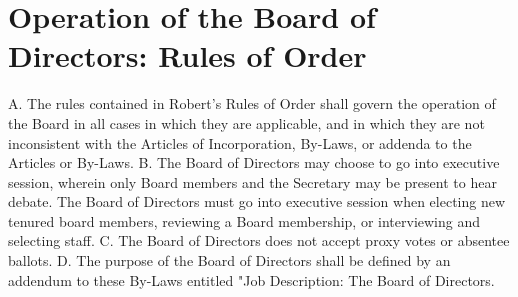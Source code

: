 \documentclass{article}
\begin{document}
\section{Operation of the Board of Directors: Rules of Order}
A.	The rules contained in Robert's Rules of Order shall govern the operation of the Board in all cases in which they are applicable, and in which they are not inconsistent with the Articles of Incorporation, By-Laws, or addenda to the Articles or By-Laws.
B.	The Board of Directors may choose to go into executive session, wherein only Board members and the Secretary may be present to hear debate.  The Board of Directors must go into executive session when electing new tenured board members, reviewing a Board membership, or interviewing and selecting staff.
C.	The Board of Directors does not accept proxy votes or absentee ballots.
D.	The purpose of the Board of Directors shall be defined by an addendum to these By-Laws entitled "Job Description: The Board of Directors.
\end{document}
